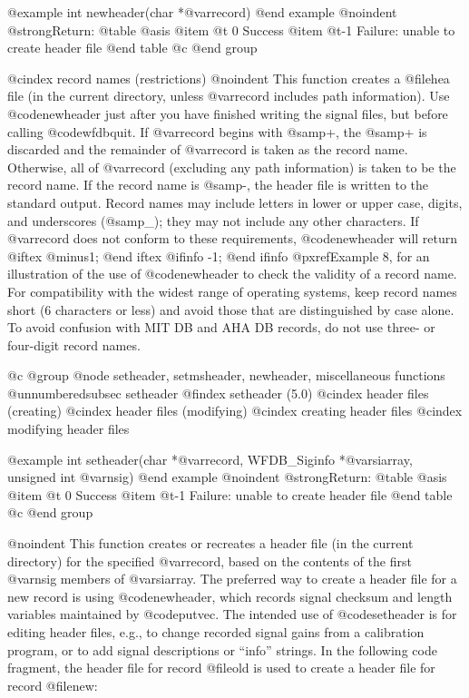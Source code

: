 {{{{{{{{{@example
int newheader(char *@var{record})
@end example
@noindent
@strong{Return:}
@table @asis
@item @t{ 0}
Success
@item @t{-1}
Failure: unable to create header file
@end table
@c @end group

@cindex record names (restrictions)
@noindent
This function creates a @file{hea} file (in the current directory, unless
@var{record} includes path information).
Use @code{newheader} just after you have finished writing the signal
files, but before calling @code{wfdbquit}.  If @var{record} begins with
@samp{+}, the @samp{+} is discarded and the remainder of @var{record} is
taken as the record name.  Otherwise, all of @var{record} (excluding any
path information) is taken to be
the record name.  If the record name is @samp{-}, the header file
is written to the standard output.  Record names may include letters in
lower or upper case, digits, and underscores (@samp{_}); they may not
include any other characters.  If @var{record} does not conform to these
requirements, @code{newheader} will return
@iftex
@minus{}1;
@end iftex
@ifinfo
-1;
@end ifinfo
@pxref{Example 8},
for an illustration of the use of @code{newheader} to check the validity
of a record name.  For compatibility with the widest range of operating
systems, keep record names short (6 characters or less) and avoid those
that are distinguished by case alone.  To avoid confusion with MIT DB
and AHA DB records, do not use three- or four-digit record names.

@c @group
@node     setheader, setmsheader, newheader, miscellaneous functions
@unnumberedsubsec setheader
@findex setheader (5.0)
@cindex header files (creating)
@cindex header files (modifying)
@cindex creating header files
@cindex modifying header files

@example
int setheader(char *@var{record}, WFDB_Siginfo *@var{siarray}, unsigned int @var{nsig})
@end example
@noindent
@strong{Return:}
@table @asis
@item @t{ 0}
Success
@item @t{-1}
Failure: unable to create header file
@end table
@c @end group

@noindent
This function creates or recreates a header file (in the current
directory) for the specified @var{record}, based on the contents of the
first @var{nsig} members of @var{siarray}.  The preferred way to create
a header file for a new record is using @code{newheader}, which records
signal checksum and length variables maintained by @code{putvec}.  The
intended use of @code{setheader} is for editing header files,
e.g., to change recorded signal gains from a calibration program, or to add
signal descriptions or ``info'' strings.  In the following code fragment, the
header file for record @file{old} is used to create a header file for
record @file{new}:

}}}}}}}}}
